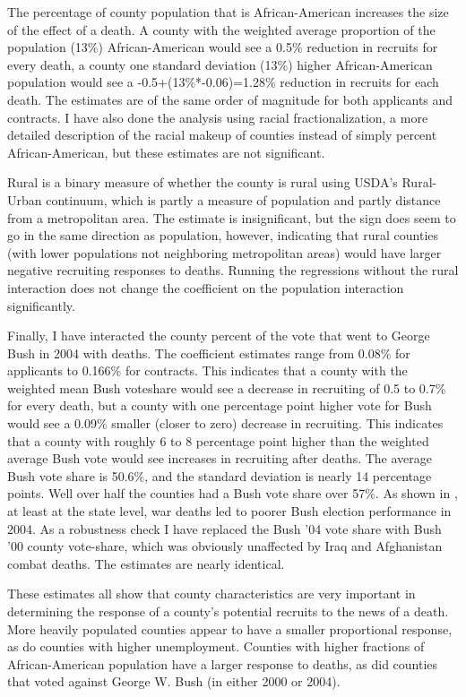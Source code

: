 \documentclass[12pt] {article}
\begin{document}
The percentage of county population that is African-American increases
the size of the effect of a death. A county with the weighted average
proportion of the population (13\%) African-American would see a 0.5\%
reduction in recruits for every death, a county one standard deviation
(13\%) higher African-American population would see a -0.5+(13\%{*}-0.06)=1.28\%
reduction in recruits for each death. The estimates are of the same
order of magnitude for both applicants and contracts. I have also
done the analysis using racial fractionalization, a more detailed description of the racial
makeup of counties instead of simply percent African-American, but these estimates are not significant.

Rural is a binary measure of whether the county is rural using USDA's Rural-Urban continuum, which is partly a measure of population and partly distance from a metropolitan area. The estimate is insignificant, but the sign does seem to go in the same direction as population, however, indicating that rural counties
(with lower populations not neighboring metropolitan areas) would have larger negative recruiting responses
to deaths. Running the regressions without the rural interaction does
not change the coefficient on the population interaction significantly.

Finally, I have interacted the county percent of the vote that went
to George Bush in 2004 with deaths. The coefficient estimates range
from 0.08\% for applicants to 0.166\% for contracts. This indicates
that a county with the weighted mean Bush voteshare would see a decrease
in recruiting of 0.5 to 0.7\% for every death, but a county with one
percentage point higher vote for Bush would see a 0.09\% smaller (closer
to zero) decrease in recruiting. This indicates that a county with
roughly 6 to 8 percentage point higher than the weighted average Bush
vote would see increases in recruiting after deaths. The average Bush
vote share is 50.6\%, and the standard deviation is nearly 14 percentage
points. Well over half the counties had a Bush vote share over 57\%.
As shown in \cite{Ted-Miguel-Bush-Deaths}, at least at the state
level, war deaths led to poorer Bush election performance in 2004.
As a robustness check I have replaced the Bush '04 vote share with
Bush '00 county vote-share, which was obviously unaffected by Iraq
and Afghanistan combat deaths. The estimates are nearly identical. 

These estimates all show that county characteristics are very important
in determining the response of a county's potential recruits to the
news of a death. More heavily populated counties appear to have a
smaller proportional response, as do counties with higher unemployment.
Counties with higher fractions of African-American population have
a larger response to deaths, as did counties that voted against George
W. Bush (in either 2000 or 2004).
\end{document}
